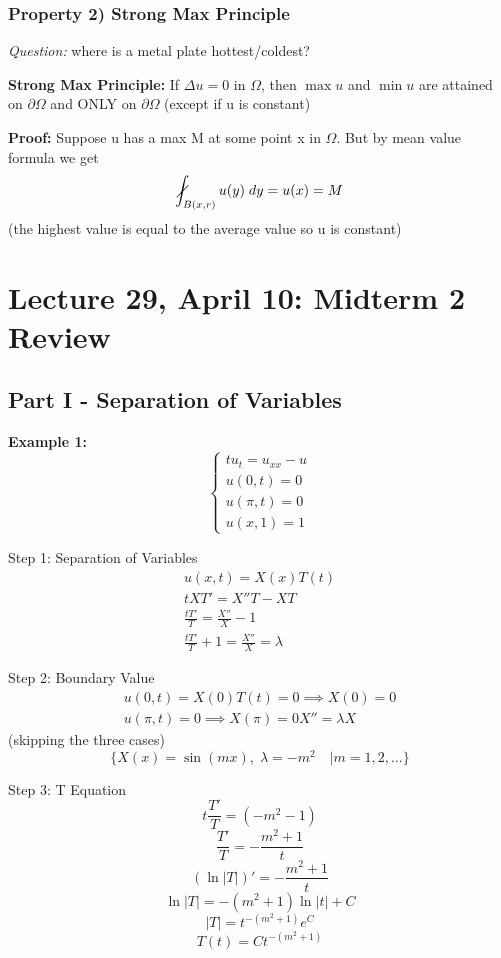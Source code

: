 \documentclass[12pt]{article}
\newcommand{\slashedint}{\diagup \!\!\!\!\!\!\! \int}
\begin{document}
\subsubsection{Property 2) Strong Max Principle}
\emph{Question:} where is a metal plate hottest/coldest?

\textbf{Strong Max Principle:} 
If $\Delta u =0$ in $\Omega$, then $\max u$ and $\min u$ are attained on $\partial \Omega$ and ONLY on $\partial \Omega$
(except if u is constant)

\textbf{Proof:} Suppose u has a max M at some point x in $\Omega$. But by mean value formula we get 
\[\slashedint_{B(x, r)} u(y)\; dy = u(x) = M\]
(the highest value is equal to the average value so u is constant)

\section*{Lecture 29, April 10: Midterm 2 Review}
\subsection*{Part I - Separation of Variables}
\textbf{Example 1:}
\[\begin{cases*}
    tu_t = u_{xx} - u\\
    u(0, t) = 0\\
    u(\pi, t) = 0\\
    u(x, 1) = 1
\end{cases*}\]

Step 1: Separation of Variables
\begin{gather*}
    u(x, t) = X(x)T(t)\\
    tXT' = X''T - XT\\
    \frac{tT'}{T} = \frac{X''}{X} - 1\\
    \frac{tT'}{T} + 1 = \frac{X''}{X} = \lambda 
\end{gather*}

Step 2: Boundary Value 
\begin{gather*}
    u(0, t) = X(0)T(t) = 0 \implies X(0) = 0\\
    u(\pi, t) = 0\implies X(\pi) = 0
    X'' = \lambda X
\end{gather*}
(skipping the three cases)
\[\{X(x) = \sin(mx), \; \lambda = -m^2 \quad | m = 1, 2, ...\}\]

Step 3: T Equation 
\[t\frac{T'}{T} = (-m^2 - 1)\]
\[\frac{T'}{T} = -\frac{m^2 + 1}{t}\]
\[(\ln|T|)' = - \frac{m^2 + 1}{t}\]
\[\ln|T| = -(m^2 + 1)\ln|t| + C\]
\[|T| = t^{-(m^2 + 1)}e^C\]
\[T(t) = Ct^{-(m^2 + 1)}\]
\end{document}
